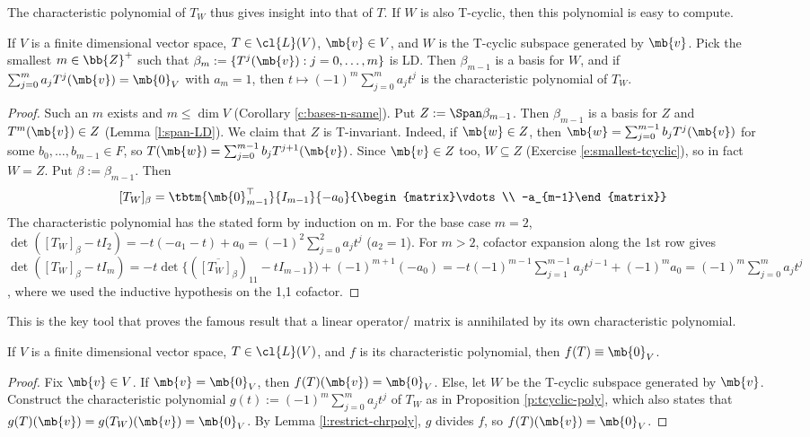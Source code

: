 The characteristic polynomial of $T_W$ thus gives insight into that of $T$. If $W$ is also T-cyclic, then this polynomial is easy to compute.
\begin{prop}\label{p:tcyclic-poly}
If $V$ is a finite dimensional vector space, $T \in \cl{L}(V)$, $\mb{v}\in V$, and $W$ is the T-cyclic subspace generated by $\mb{v}$. Pick the smallest $m \in \bb{Z}^+$ such that $\beta_m:= \{ T^j( \mb{v}):j=0, \ldots,m \}$ is LD.
Then $\beta_{m-1}$ is a basis for $W$, and if $\sum_{j=0}^ma_jT^j( \mb{v})= \mb{0}_V$ with $a_m=1$, then $t \mapsto (-1)^m \sum_{j=0}^ma_jt^j$ is the characteristic polynomial of $T_W$.
\end{prop}
\begin{proof}%
Such an $m$ exists and $m \leq \dim V$ (Corollary \ref{c:bases-n-same}). Put $Z:= \Span \beta_{m-1}$. Then $\beta_{m-1}$ is a basis for $Z$ and $T^m( \mb{v}) \in Z$ (Lemma \ref{l:span-LD}).
We claim that $Z$ is T-invariant. Indeed, if $\mb{w}\in Z$, then $\mb{w}= \sum_{j=0}^{m-1}b_jT^j( \mb{v})$ for some $b_0, \ldots, b_{m-1}\in F$, so $T( \mb{w})= \sum_{j=0}^{m-1}b_jT^{j+1}( \mb{v})$.
Since $\mb{v}\in Z$ too, $W \subseteq Z$ (Exercise \ref{e:smallest-tcyclic}), so in fact $W=Z$. Put $\beta:= \beta_{m-1}$. Then
\[ [T_W]_\beta= \tbtm{\mb{0}_{m-1}^\top}{I_{m-1}}{-a_0}{\begin{matrix}\vdots \\ -a_{m-1}\end{matrix}}\]
The characteristic polynomial has the stated form by induction on m. For the base case $m=2$, $\det ([T_W]_\beta -tI_2)=-t(-a_1-t)+a_0=(-1)^2 \sum_{j=0}^2a_jt^j$ ($a_2=1$).
For $m>2$, cofactor expansion along the 1st row gives $\det ([T_W]_\beta -tI_m)=-t \det \{ ( \overline{[T_W]_\beta})_{11}-tI_{m-1}\})+(-1)^{m+1}(-a_0)=-t(-1)^{m-1} \sum_{j=1}^{m-1}a_jt^{j-1}+(-1)^ma_0= (-1)^m \sum_{j=0}^ma_jt^j$, where we used the inductive hypothesis on the 1,1 cofactor.
\end{proof}
This is the key tool that proves the famous result that a linear operator/ matrix is annihilated by its own characteristic polynomial.
\begin{thm}
If $V$ is a finite dimensional vector space, $T \in \cl{L}(V)$, and $f$ is its characteristic polynomial, then $f(T) \equiv \mb{0}_V$.
\end{thm}
\begin{proof}%
Fix $\mb{v}\in V$. If $\mb{v}= \mb{0}_V$, then $f(T)( \mb{v})= \mb{0}_V$. Else, let $W$ be the T-cyclic subspace generated by $\mb{v}$. Construct the characteristic polynomial $g(t):=(-1)^m \sum_{j=0}^ma_jt^j$ of $T_W$ as in Proposition \ref{p:tcyclic-poly}, which also states that $g(T)( \mb{v})=g(T_W)( \mb{v})= \mb{0}_V$.
By Lemma \ref{l:restrict-chrpoly}, $g$ divides $f$, so $f(T)( \mb{v})= \mb{0}_V$.
\end{proof}
